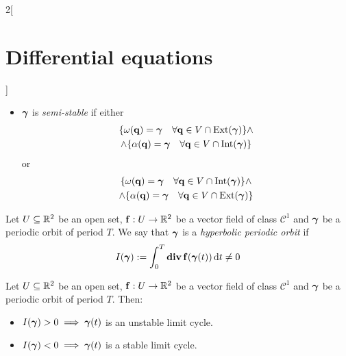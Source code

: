 \documentclass[../../../main.tex]{subfiles}
\begin{document}
\begin{multicols}{2}[\section{Differential equations}]
\begin{proposition}
\begin{itemize}
      \item $\boldsymbol{\mathrm{\gamma}}$ is \emph{semi-stable} if either
            \begin{multline*}
              \{\omega(\boldsymbol{\mathrm{q}})=\boldsymbol{\mathrm{\gamma}}\quad\forall \boldsymbol{\mathrm{q}}\in V\cap\operatorname{Ext}(\boldsymbol{\mathrm{\gamma}})\} \land \\\land\{\alpha(\boldsymbol{\mathrm{q}})=\boldsymbol{\mathrm{\gamma}}\quad\forall \boldsymbol{\mathrm{q}}\in V\cap\operatorname{Int}(\boldsymbol{\mathrm{\gamma}})\}
            \end{multline*}
            or
            \begin{multline*}
              \{\omega(\boldsymbol{\mathrm{q}})=\boldsymbol{\mathrm{\gamma}}\quad\forall \boldsymbol{\mathrm{q}}\in V\cap\operatorname{Int}(\boldsymbol{\mathrm{\gamma}})\}\land\\\land \{\alpha(\boldsymbol{\mathrm{q}})=\boldsymbol{\mathrm{\gamma}}\quad\forall \boldsymbol{\mathrm{q}}\in V\cap\operatorname{Ext}(\boldsymbol{\mathrm{\gamma}})\}
            \end{multline*}
    \end{itemize}
  \end{proposition}
  \begin{definition}
    Let $U\subseteq \mathbb{R}^2$ be an open set, $\boldsymbol{\mathrm{f}}:U\rightarrow\mathbb{R}^2$ be a vector field of class $\mathcal{C}^1$ and $\boldsymbol{\mathrm{\gamma}}$ be a periodic orbit of period $T$. We say that $\boldsymbol{\mathrm{\gamma}}$ is a \emph{hyperbolic periodic orbit} if $$I(\boldsymbol{\mathrm{\gamma}}):=\int_0^T\operatorname{\boldsymbol{\mathrm{div}}}\boldsymbol{\mathrm{f}}(\boldsymbol{\mathrm{\gamma}}(t))\dd{t}\ne 0$$
  \end{definition}
  \begin{theorem}
    Let $U\subseteq \mathbb{R}^2$ be an open set, $\boldsymbol{\mathrm{f}}:U\rightarrow\mathbb{R}^2$ be a vector field of class $\mathcal{C}^1$ and $\boldsymbol{\mathrm{\gamma}}$ be a periodic orbit of period $T$. Then:
    \begin{itemize}
      \item $I(\boldsymbol{\mathrm{\gamma}})>0\implies\boldsymbol{\mathrm{\gamma}}(t)$ is an unstable limit cycle.
      \item $I(\boldsymbol{\mathrm{\gamma}})<0\implies\boldsymbol{\mathrm{\gamma}}(t)$ is a stable limit cycle.
    \end{itemize}
  \end{theorem}

\end{multicols}
\end{document}
